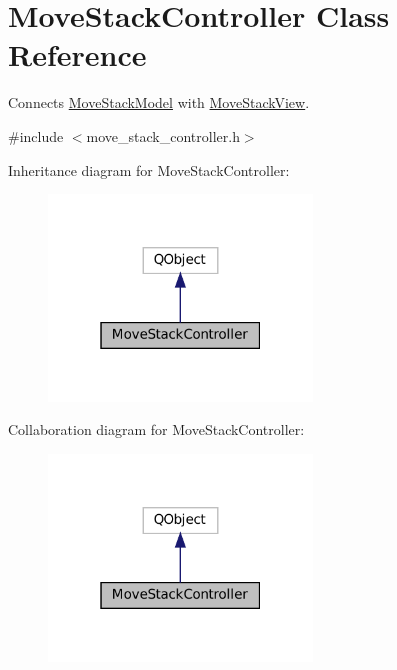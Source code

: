 \hypertarget{class_move_stack_controller}{}\section{Move\+Stack\+Controller Class Reference}
\label{class_move_stack_controller}


Connects \mbox{\hyperlink{class_move_stack_model}{Move\+Stack\+Model}} with \mbox{\hyperlink{class_move_stack_view}{Move\+Stack\+View}}.  




{\ttfamily \#include $<$move\+\_\+stack\+\_\+controller.\+h$>$}



Inheritance diagram for Move\+Stack\+Controller\+:
\nopagebreak
\begin{figure}[H]
\begin{center}
\leavevmode
\includegraphics[width=199pt]{class_move_stack_controller__inherit__graph}
\end{center}
\end{figure}


Collaboration diagram for Move\+Stack\+Controller\+:
\nopagebreak
\begin{figure}[H]
\begin{center}
\leavevmode
\includegraphics[width=199pt]{class_move_stack_controller__coll__graph}
\end{center}
\end{figure}
